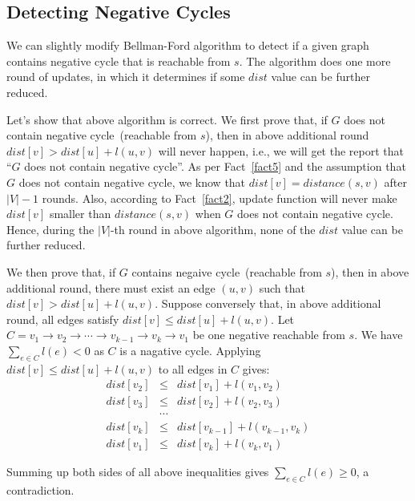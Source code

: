 \subsection*{Detecting Negative Cycles}

We can slightly modify Bellman-Ford algorithm to detect if a given graph contains negative cycle that is reachable from $s$.
The algorithm does one more round of updates, in which it determines if some $dist$ value can be further reduced.

\begin{minipage}{0.8\textwidth}
	\xxx
	\xxx
	\xxx
	\xxx
	\xxx
	\xxx
	\xxx
	\xxx
	\xxx
	\xxx
	\xxx
	\xxx
	\xxx
\end{minipage}


Let's show that above algorithm is correct.
We first prove that, if $G$ does not contain negative cycle~(reachable from $s$), then in above additional round $dist[v] > dist[u] + l(u,v)$ will never happen,
i.e., we will get the report that ``$G$ does not contain negative cycle''.
As per Fact~\ref{fact5} and the assumption that $G$ does not contain negative cycle, we know that $dist[v] = distance(s,v)$ after $|V| -1 $ rounds.
Also, according to Fact~\ref{fact2}, update function will never make $dist[v]$ smaller than $distance(s,v)$ when $G$ does not contain negative cycle.
Hence, during the $|V|$-th round in above algorithm, none of the $dist$ value can be further reduced.

We then prove that, if $G$ contains negaive cycle~(reachable from $s$), then in above additional round, there must exist an edge $(u,v)$ such that $dist[v] > dist[u] + l(u,v)$.
Suppose conversely that, in above additional round, all edges satisfy $dist[v] \le dist[u] + l(u,v)$.
Let $C = v_1 \to v_2 \to \cdots \to v_{k-1} \to v_k \to v_1$ be one negative reachable from $s$.  We have $\sum_{e\in C} l(e) < 0$ as $C$ is a nagative cycle.
Applying $dist[v] \le dist[u] + l(u,v)$ to all edges in $C$ gives:
\begin{displaymath}
\begin{array}{llllllllllllll}
	dist[v_2] & \le & dist[v_1] + l(v_1, v_2) \\
	dist[v_3] & \le & dist[v_2] + l(v_2, v_3) \\
	& \cdots & \\
	dist[v_k] & \le & dist[v_{k-1}] + l(v_{k-1}, v_k) \\
	dist[v_1] & \le & dist[v_{k}] + l(v_{k}, v_1)
\end{array}
\end{displaymath}

Summing up both sides of all above inequalities gives $\sum_{e\in C} l(e) \ge 0$, a contradiction.
